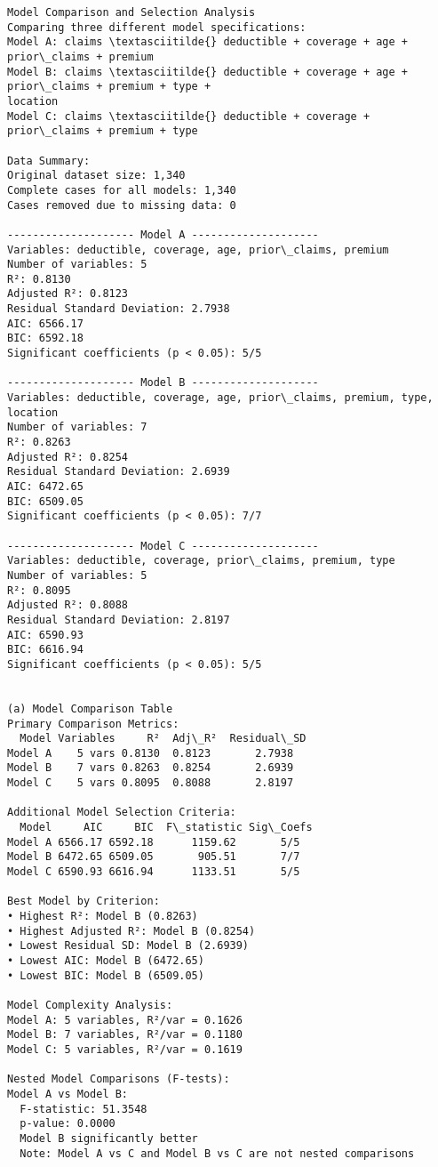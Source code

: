 \documentclass[8pt, twocolumn]{extarticle}
\begin{document}
    \begin{Verbatim}[commandchars=\\\{\}]
Model Comparison and Selection Analysis
Comparing three different model specifications:
Model A: claims \textasciitilde{} deductible + coverage + age + prior\_claims + premium
Model B: claims \textasciitilde{} deductible + coverage + age + prior\_claims + premium + type +
location
Model C: claims \textasciitilde{} deductible + coverage + prior\_claims + premium + type

Data Summary:
Original dataset size: 1,340
Complete cases for all models: 1,340
Cases removed due to missing data: 0

-------------------- Model A --------------------
Variables: deductible, coverage, age, prior\_claims, premium
Number of variables: 5
R²: 0.8130
Adjusted R²: 0.8123
Residual Standard Deviation: 2.7938
AIC: 6566.17
BIC: 6592.18
Significant coefficients (p < 0.05): 5/5

-------------------- Model B --------------------
Variables: deductible, coverage, age, prior\_claims, premium, type, location
Number of variables: 7
R²: 0.8263
Adjusted R²: 0.8254
Residual Standard Deviation: 2.6939
AIC: 6472.65
BIC: 6509.05
Significant coefficients (p < 0.05): 7/7

-------------------- Model C --------------------
Variables: deductible, coverage, prior\_claims, premium, type
Number of variables: 5
R²: 0.8095
Adjusted R²: 0.8088
Residual Standard Deviation: 2.8197
AIC: 6590.93
BIC: 6616.94
Significant coefficients (p < 0.05): 5/5


(a) Model Comparison Table
Primary Comparison Metrics:
  Model Variables     R²  Adj\_R²  Residual\_SD
Model A    5 vars 0.8130  0.8123       2.7938
Model B    7 vars 0.8263  0.8254       2.6939
Model C    5 vars 0.8095  0.8088       2.8197

Additional Model Selection Criteria:
  Model     AIC     BIC  F\_statistic Sig\_Coefs
Model A 6566.17 6592.18      1159.62       5/5
Model B 6472.65 6509.05       905.51       7/7
Model C 6590.93 6616.94      1133.51       5/5

Best Model by Criterion:
• Highest R²: Model B (0.8263)
• Highest Adjusted R²: Model B (0.8254)
• Lowest Residual SD: Model B (2.6939)
• Lowest AIC: Model B (6472.65)
• Lowest BIC: Model B (6509.05)

Model Complexity Analysis:
Model A: 5 variables, R²/var = 0.1626
Model B: 7 variables, R²/var = 0.1180
Model C: 5 variables, R²/var = 0.1619

Nested Model Comparisons (F-tests):
Model A vs Model B:
  F-statistic: 51.3548
  p-value: 0.0000
  Model B significantly better
  Note: Model A vs C and Model B vs C are not nested comparisons
    \end{Verbatim}
\end{document}
